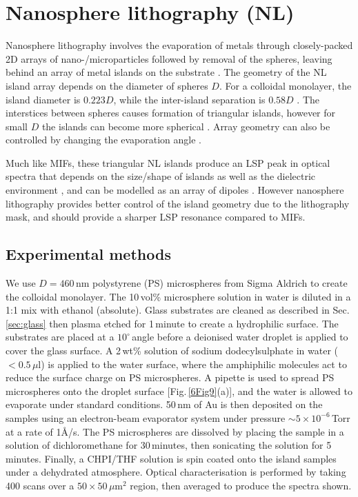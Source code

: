 \section{Nanosphere lithography (NL)}
Nanosphere lithography involves the evaporation of metals through closely-packed 2D arrays of nano-/microparticles followed by removal of the spheres, leaving behind an array of metal islands on the substrate \cite{Haynes2001}. The geometry of the NL island array depends on the diameter of spheres $D$. For a colloidal monolayer, the island diameter is $0.223D$, while the inter-island separation is $0.58D$ \cite{Hulteen1995}. The interstices between spheres causes formation of triangular islands, however for small $D$ the islands can become more spherical \cite{Hulteen1999}. Array geometry can also be controlled by changing the evaporation angle \cite{Haynes2002}.

Much like MIFs, these triangular NL islands produce an LSP peak in optical spectra that depends on the size/shape of islands as well as the dielectric environment \cite{Jensen2000}, and can be modelled as an array of dipoles \cite{Malinsky2001, Jensen1999}. However nanosphere lithography provides better control of the island geometry due to the lithography mask, and should provide a sharper LSP resonance compared to MIFs.

\subsection{Experimental methods}
We use $D=460$\,nm polystyrene (PS) microspheres from Sigma Aldrich to create the colloidal monolayer. The 10\,vol\% microsphere solution in water is diluted in a 1:1 mix with ethanol (absolute). Glass substrates are cleaned as described in Sec.\,\ref{sec:glass} then plasma etched for 1\,minute to create a hydrophilic surface. The substrates are placed at a $10^{\circ}$\,angle before a deionised water droplet is applied to cover the glass surface. A 2\,wt\% solution of sodium dodecylsulphate in water ($<0.5\,\mu$l) is applied to the water surface, where the amphiphilic molecules act to reduce the surface charge on PS microspheres. A pipette is used to spread PS microspheres onto the droplet surface [Fig.\,\ref{6Fig9}(a)], and the water is allowed to evaporate under standard conditions. 50\,nm of Au is then deposited on the samples using an electron-beam evaporator system under pressure $\sim5\times10^{-6}$\,Torr at a rate of 1\AA/s. The PS microspheres are dissolved by placing the sample in a solution of dichloromethane for 30\,minutes, then sonicating the solution for 5\,minutes. Finally, a CHPI/THF solution is spin coated onto the island samples under a dehydrated atmosphere. Optical characterisation is performed by taking 400 scans over a $50\times50\,\mu$m$^{2}$ region, then averaged to produce the spectra shown. 

